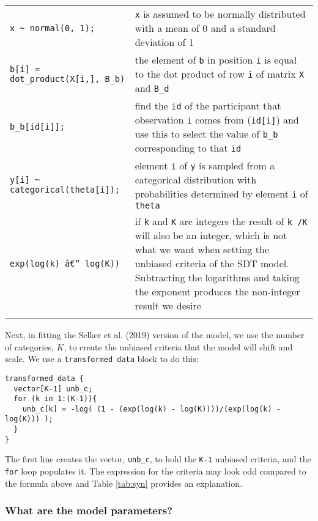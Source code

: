 \documentclass[
  english,
  ,man,floatsintext]{apa6}
\begin{document}
\begin{table}[t]
{\begin{tabular}{p{}p{}}
  \texttt{x \textasciitilde{} normal(0, 1);} & \texttt{x} is assumed to be normally distributed with a mean of 0 and a standard deviation of 1 \\ 
  \texttt{b[i] = dot\_product(X[i,], B\_b) } & the element of \texttt{b} in position \texttt{i} is equal to the dot product of row \texttt{i} of matrix \texttt{X} and \texttt{B\_d} \\ 
  \texttt{b\_b[id[i]];} & find the \texttt{id} of the participant that observation \texttt{i} comes from (\texttt{id[i]}) and use this to select the value of \texttt{b\_b} corresponding to that \texttt{id} \\ 
  \texttt{y[i] \textasciitilde{} categorical(theta[i]);} & element \texttt{i} of \texttt{y} is sampled from a categorical distribution with probabilities determined by element \texttt{i} of \texttt{theta} \\ 
  \texttt{exp(log(k) â€“ log(K))} & if \texttt{k} and \texttt{K} are integers the result of \texttt{k \slash K} will also be an integer, which is not what we want when setting the unbiased criteria of the SDT model. Subtracting the logarithms and taking the exponent produces the non-integer result we desire \\ 
   \bottomrule \\ \end{tabular}
}
\end{table}

Next, in fitting the Selker et al. (2019) version of the model, we use the number of categories, \(K\), to create the unbiased criteria that the model will shift and scale. We use a \texttt{transformed\ data} block to do this:

\begin{verbatim}
transformed data {
  vector[K-1] unb_c;
  for (k in 1:(K-1)){
    unb_c[k] = -log( (1 - (exp(log(k) - log(K))))/(exp(log(k) - log(K))) );
  }
}
\end{verbatim}

The first line creates the vector, \texttt{unb\_c}, to hold the \texttt{K-1} unbiased criteria, and the \texttt{for} loop populates it. The expression for the criteria may look odd compared to the formula above and Table \ref{tab:syn} provides an explanation.

\hypertarget{what-are-the-model-parameters}{%
\subsubsection{What are the model parameters?}\label{what-are-the-model-parameters}}
\end{document}
